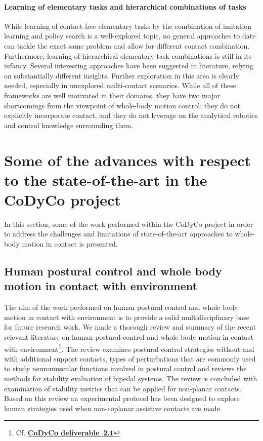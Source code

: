 \documentclass[final,5p,twocolumn]{elsarticle}
\begin{document}
\paragraph{Learning of elementary tasks and hierarchical combinations of tasks}
While learning of contact-free elementary tasks by the combination of imitation learning and policy search \cite{Abbeel2005} \cite{Kober2010} is a well-explored topic, no general approaches to date can tackle the exact same problem and allow for different contact combination. Furthermore, learning of hierarchical elementary task combinations is still in its infancy. Several interesting approaches have been suggested \cite{Stulp2011a} \cite{Mulling2010} \cite{Muico2011} \cite{Daniel2012} in literature, relying on substantially different insights. Further exploration in this area is clearly needed, especially in unexplored multi-contact scenarios.
While all of these frameworks are well motivated in their domains, they have two major shortcomings from the viewpoint of whole-body motion control: they do not explicitly incorporate contact, and they do not leverage on the analytical robotics and control knowledge surrounding them.

\section{Some of the advances with respect to the state-of-the-art in the CoDyCo project}

In this section, some of the work performed within the CoDyCo project in order to address the challenges and limitations of state-of-the-art approaches to whole-body motion in contact is presented.

\subsection{Human postural control and whole body motion in contact with environment}
The aim of the work performed on human postural control and whole body motion in contact with environment is to provide a solid multidisciplinary base for future research work. We made a thorough review and summary of the recent relevant literature on human postural control and whole body motion in contact with environment\footnote{Cf. \href{https://github.com/robotology-playground/codyco-deliverables/blob/master/D2.1/pdf/D2.1.pdf?raw=true}{\textbf{CoDyCo deliverable~2.1}}}. The review examines postural control strategies without and with additional support contacts, types of perturbations that are commonly used to study neuromuscular functions involved in postural control and reviews the methods for stability evaluation of bipedal systems. The review is concluded with examination of stability metrics that can be applied for non-planar contacts. Based on this review an experimental protocol has been designed to explore human strategies used when non-coplanar assistive contacts are made.
\end{document}
